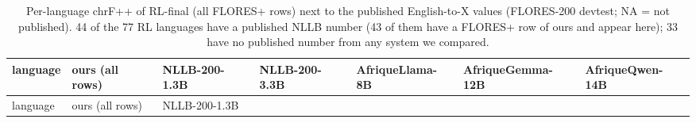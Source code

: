 {\footnotesize\setlength{\tabcolsep}{3pt}
\begin{longtable}[]{@{}
  >{\raggedright\arraybackslash}p{}
  >{\raggedleft\arraybackslash}p{}
  >{\raggedleft\arraybackslash}p{}
  >{\raggedleft\arraybackslash}p{}
  >{\raggedleft\arraybackslash}p{}
  >{\raggedleft\arraybackslash}p{}
  >{\raggedleft\arraybackslash}p{}@{}}
\caption{Per-language chrF++ of RL-final (all FLORES+ rows) next to the published English-to-X values (FLORES-200 devtest; NA = not published). 44 of the 77 RL languages have a published NLLB number (43 of them have a FLORES+ row of ours and appear here); 33 have no published number from any system we compared.}\label{tab:t_published_lang}\tabularnewline
\toprule\noalign{}
\begin{minipage}[b]{\linewidth}\raggedright
language
\end{minipage} & \begin{minipage}[b]{\linewidth}\raggedleft
ours (all rows)
\end{minipage} & \begin{minipage}[b]{\linewidth}\raggedleft
NLLB-200-1.3B
\end{minipage} & \begin{minipage}[b]{\linewidth}\raggedleft
NLLB-200-3.3B
\end{minipage} & \begin{minipage}[b]{\linewidth}\raggedleft
AfriqueLlama-8B
\end{minipage} & \begin{minipage}[b]{\linewidth}\raggedleft
AfriqueGemma-12B
\end{minipage} & \begin{minipage}[b]{\linewidth}\raggedleft
AfriqueQwen-14B
\end{minipage} \\
\midrule\noalign{}
\endfirsthead
\toprule\noalign{}
\begin{minipage}[b]{\linewidth}\raggedright
language
\end{minipage} & \begin{minipage}[b]{\linewidth}\raggedleft
ours (all rows)
\end{minipage} & \begin{minipage}[b]{\linewidth}\raggedleft
NLLB-200-1.3B

\end{minipage}
\end{longtable}}
